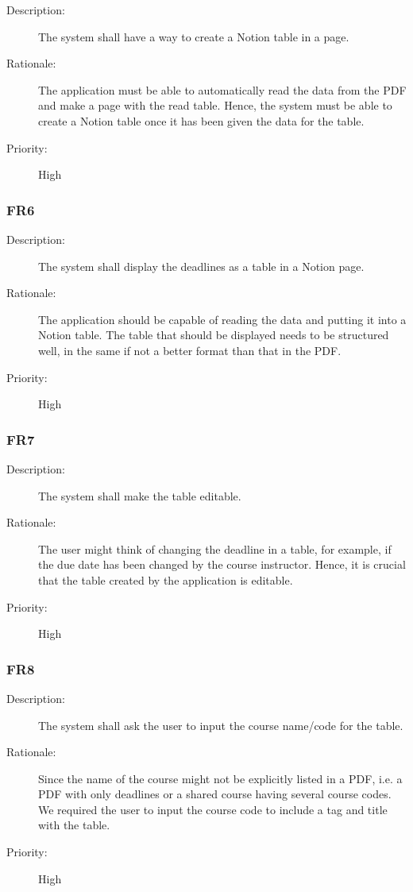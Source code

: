 \documentclass[12pt, titlepage]{article}
\begin{document}
\begin{description}
  \item[Description:] The system shall have a way to create a Notion table in a page. 
  \item[Rationale:] The application must be able to automatically read the data from the PDF and make a page with the read table. Hence, the system must be able to create a Notion table once it has been given the data for the table. 
  \item[Priority:] High
\end{description}

\subsubsection{FR6}

\begin{description}
  \item[Description:] The system shall display the deadlines as a table in a Notion page. 
  \item[Rationale:] The application should be capable of reading the data and putting it into a Notion table. The table that should be displayed needs to be structured well, in the same if not a better format than that in the PDF. 
  \item[Priority:] High
\end{description}

\subsubsection{FR7}

\begin{description}
  \item[Description:] The system shall make the table editable. 
  \item[Rationale:] The user might think of changing the deadline in a table, for example, if the due date has been changed by the course instructor. Hence, it is crucial that the table created by the application is editable. 
  \item[Priority:] High
\end{description}

\subsubsection{FR8}

\begin{description}
  \item[Description:] The system shall ask the user to input the course name/code for the table. 
  \item[Rationale:] Since the name of the course might not be explicitly listed in a PDF, i.e. a PDF with only deadlines or a shared course having several course codes. We required the user to input the course code to include a tag and title with the table. 
  \item[Priority:] High
\end{description}
\end{document}
